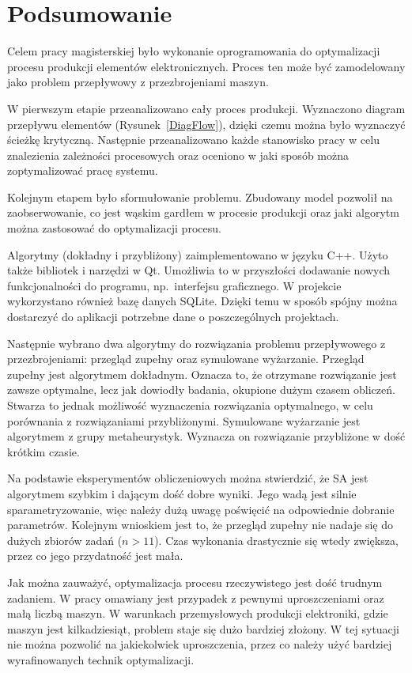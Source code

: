\chapter{Podsumowanie}

Celem pracy magisterskiej było wykonanie oprogramowania do optymalizacji procesu produkcji elementów elektronicznych. Proces ten może być zamodelowany jako problem przepływowy z przezbrojeniami maszyn.

W pierwszym etapie przeanalizowano cały proces produkcji. Wyznaczono diagram przepływu elementów (Rysunek~\ref{DiagFlow}), dzięki czemu można było wyznaczyć ścieżkę krytyczną. Następnie przeanalizowano każde stanowisko pracy w celu znalezienia zależności procesowych oraz oceniono w jaki sposób można zoptymalizować pracę systemu.

Kolejnym etapem było sformułowanie problemu. Zbudowany model pozwolił na zaobserwowanie, co jest wąskim gardłem w procesie produkcji oraz jaki algorytm można zastosować do optymalizacji procesu.

Algorytmy (dokładny i przybliżony) zaimplementowano w języku C++. Użyto także bibliotek i narzędzi w Qt. Umożliwia to w przyszłości dodawanie nowych funkcjonalności do programu, np.\ interfejsu graficznego. W projekcie wykorzystano również bazę danych SQLite. Dzięki temu w sposób spójny można dostarczyć do aplikacji potrzebne dane o poszczególnych projektach.

Następnie wybrano dwa algorytmy do rozwiązania problemu przepływowego z przezbrojeniami: przegląd zupełny oraz symulowane wyżarzanie. Przegląd zupełny jest algorytmem dokładnym. Oznacza to, że otrzymane rozwiązanie jest zawsze optymalne, lecz jak dowiodły badania, okupione dużym czasem obliczeń. Stwarza to jednak możliwość wyznaczenia rozwiązania optymalnego, w celu porównania z rozwiązaniami przybliżonymi. Symulowane wyżarzanie jest algorytmem z grupy metaheurystyk. Wyznacza on rozwiązanie przybliżone w dość krótkim czasie.

Na podstawie eksperymentów obliczeniowych można stwierdzić, że SA jest algorytmem szybkim i dającym dość dobre wyniki. Jego wadą jest silnie sparametryzowanie, więc należy dużą uwagę poświęcić na odpowiednie dobranie parametrów. Kolejnym wnioskiem jest to, że przegląd zupełny nie nadaje się do dużych zbiorów zadań ($n>11$). Czas wykonania drastycznie się wtedy zwiększa, przez co jego przydatność jest mała.

Jak można zauważyć, optymalizacja procesu rzeczywistego jest dość trudnym zadaniem. W pracy omawiany jest przypadek z pewnymi uproszczeniami oraz małą liczbą maszyn. W warunkach przemysłowych produkcji elektroniki, gdzie maszyn jest kilkadziesiąt, problem staje się dużo bardziej złożony. W tej sytuacji nie można pozwolić na jakiekolwiek uproszczenia, przez co należy użyć bardziej wyrafinowanych technik optymalizacji.